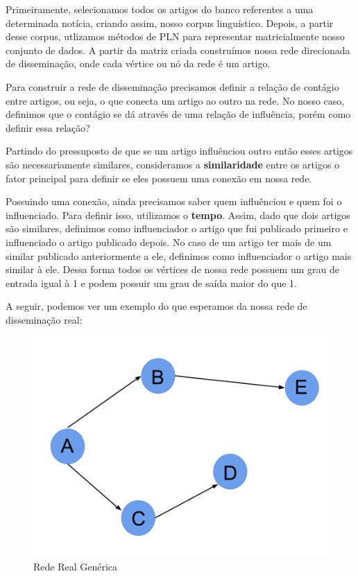 \documentclass[a4paper,12pt]{article}
\begin{document}
Primeiramente, selecionamos todos os artigos do banco referentes a uma determinada notícia, criando assim, nosso corpus linguístico.
Depois, a partir desse corpus, utlizamos métodos de PLN para representar matricialmente nosso conjunto de dados. A partir da matriz 
criada construímos nossa rede direcionada de disseminação, onde cada vértice ou nó da rede é um artigo.

Para construir a rede de disseminação precisamos definir a relação de contágio entre artigos, ou seja, o que conecta um artigo ao outro 
na rede. No nosso caso, definimos que o contágio se dá através de uma relação de influência, porém como definir essa relação? 

Partindo do
pressuposto de que se um artigo influênciou outro então esses artigos são necessariamente similares, consideramos a \textbf{similaridade}
entre os artigos o fator principal para definir se eles possuem uma conexão em nossa rede.

Possuindo uma conexão, ainda precisamos saber quem influênciou e quem foi o influenciado. Para definir isso, utilizamos o \textbf{tempo}.
Assim, dado que dois artigos são similares, definimos como influenciador o artigo que fui publicado primeiro e influenciado o artigo publicado
depois. No caso de um artigo ter mais de um similar publicado anteriormente a ele, definimos como influenciador o artigo
mais similar à ele. Dessa forma todos os vértices de nossa rede possuem um grau de entrada igual à 1 e podem possuir um grau de saída maior
do que 1.

\pagebreak
A seguir, podemos ver um exemplo do que esperamos da nossa rede de disseminação real:

\begin{figure}[h]
 \centering
 \includegraphics[scale=0.2]{./rede1.png}
 \caption{Rede Real Genérica}
\end{figure}
\end{document}
